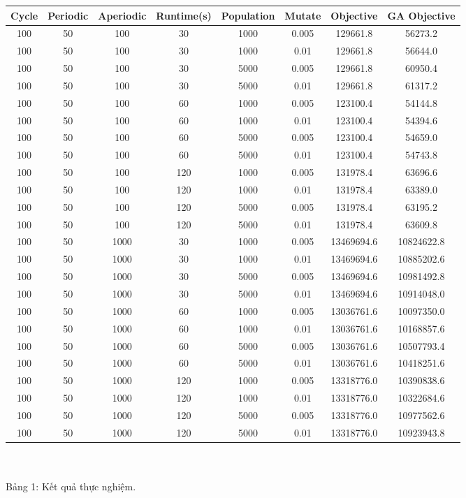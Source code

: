 \documentclass[a4paper,12pt]{article}
\begin{document}
\begin{tabular}{|c|c|c|c|c|c|c|c|}
\hline
Cycle&Periodic&Aperiodic&Runtime(s)&Population&Mutate&Objective&GA Objective\\
\hline
100&50&100&30&1000&0.005&129661.8&56273.2\\
\hline
100&50&100&30&1000&0.01&129661.8&56644.0\\
\hline
100&50&100&30&5000&0.005&129661.8&60950.4\\
\hline
100&50&100&30&5000&0.01&129661.8&61317.2\\
\hline
100&50&100&60&1000&0.005&123100.4&54144.8\\
\hline
100&50&100&60&1000&0.01&123100.4&54394.6\\
\hline
100&50&100&60&5000&0.005&123100.4&54659.0\\
\hline
100&50&100&60&5000&0.01&123100.4&54743.8\\
\hline
100&50&100&120&1000&0.005&131978.4&63696.6\\
\hline
100&50&100&120&1000&0.01&131978.4&63389.0\\
\hline
100&50&100&120&5000&0.005&131978.4&63195.2\\
\hline
100&50&100&120&5000&0.01&131978.4&63609.8\\
\hline
100&50&1000&30&1000&0.005&13469694.6&10824622.8\\
\hline
100&50&1000&30&1000&0.01&13469694.6&10885202.6\\
\hline
100&50&1000&30&5000&0.005&13469694.6&10981492.8\\
\hline
100&50&1000&30&5000&0.01&13469694.6&10914048.0\\
\hline
100&50&1000&60&1000&0.005&13036761.6&10097350.0\\
\hline
100&50&1000&60&1000&0.01&13036761.6&10168857.6\\
\hline
100&50&1000&60&5000&0.005&13036761.6&10507793.4\\
\hline
100&50&1000&60&5000&0.01&13036761.6&10418251.6\\
\hline
100&50&1000&120&1000&0.005&13318776.0&10390838.6\\
\hline
100&50&1000&120&1000&0.01&13318776.0&10322684.6\\
\hline
100&50&1000&120&5000&0.005&13318776.0&10977562.6\\
\hline
100&50&1000&120&5000&0.01&13318776.0&10923943.8\\
\hline
\end{tabular}
\\\\
\hspace*{10mm}Bảng 1: Kết quả thực nghiệm.\\
\end{document}
